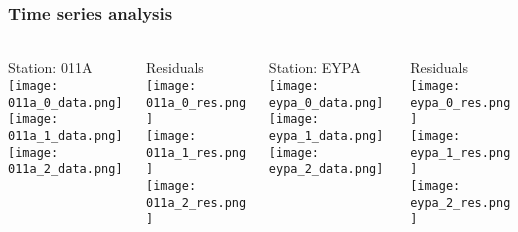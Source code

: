 \begin{frame}
  \frametitle{Time series analysis}
  \framesubtitle{}
  \label{}
  \vskip-1cm
  \begin{columns}[T]
    \begin{column}{.25\textwidth}
      \begin{center}
      Station: 011A
        \texttt{[image: 011a\_0\_data.png]}\\
        \texttt{[image: 011a\_1\_data.png]}\\
        \texttt{[image: 011a\_2\_data.png]}
      \end{center}
    \end{column}
    \begin{column}{.25\textwidth}
      \begin{center}
      Residuals
        \texttt{[image: 011a\_0\_res.png]}\\
        \texttt{[image: 011a\_1\_res.png]}\\
        \texttt{[image: 011a\_2\_res.png]}
      \end{center}
    \end{column}
    \begin{column}{.25\textwidth}
       \begin{center}
       Station: EYPA
        \texttt{[image: eypa\_0\_data.png]}\\
        \texttt{[image: eypa\_1\_data.png]}\\
        \texttt{[image: eypa\_2\_data.png]}
      \end{center}
    \end{column}
    \begin{column}{.25\textwidth}
      \begin{center}
      Residuals
        \texttt{[image: eypa\_0\_res.png]}\\
        \texttt{[image: eypa\_1\_res.png]}\\
        \texttt{[image: eypa\_2\_res.png]}
      \end{center}
    \end{column}
  \end{columns}
\end{frame}
\note{}


%       
%      


